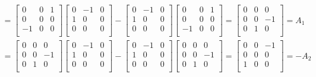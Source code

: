 \documentclass[../main.tex]{subfiles}
\begin{document}
\begin{align*}
[A_2,A_3] = \begin{bmatrix}
    0&0&1\\    
    0&0&0\\
    -1&0&0\\    
 \end{bmatrix}
 \begin{bmatrix}
    0&-1&0\\    
    1&0&0\\
    0&0&0\\    
\end{bmatrix} -
\begin{bmatrix}
    0&-1&0\\    
    1&0&0\\
    0&0&0\\    
\end{bmatrix} \begin{bmatrix}
    0&0&1\\    
    0&0&0\\
    -1&0&0\\    
\end{bmatrix}= \begin{bmatrix}
    0&0&0\\    
    0&0&-1\\
    0&1&0\\    
\end{bmatrix}
=A_1
\end{align*}
\begin{align*}
[A_1,A_3] = \begin{bmatrix}
    0&0&0\\    
    0&0&-1\\
    0&1&0\\    
\end{bmatrix} \begin{bmatrix}
     0&-1&0\\    
     1&0&0\\
     0&0&0\\    
 \end{bmatrix}-
 \begin{bmatrix}
     0&-1&0\\    
     1&0&0\\
     0&0&0\\    
 \end{bmatrix} \begin{bmatrix}
     0&0&0\\    
     0&0&-1\\
     0&1&0\\    
 \end{bmatrix}= \begin{bmatrix}
     0&0&-1\\    
     0&0&0\\
     1&0&0\\    
 \end{bmatrix}
 =-A_2
 \end{align*}
\end{document}
